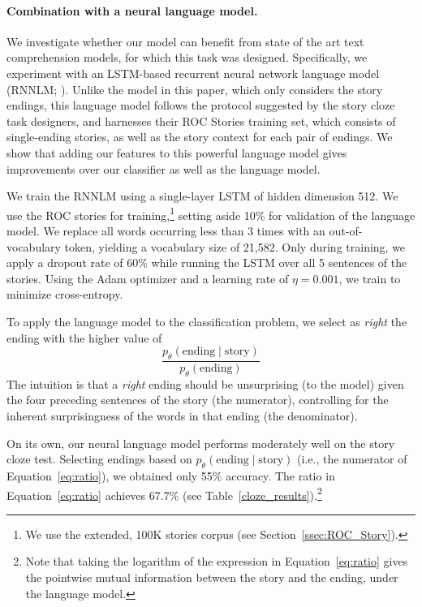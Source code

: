 \documentclass[11pt,a4paper]{article}
\newcommand{\secref}[1]{Section~\ref{ssec:#1}}
\newcommand{\tabref}[1]{Table~\ref{#1}}
\begin{document}
\paragraph{Combination with a neural language model.}
We investigate whether our model can benefit from state of the art text comprehension models, for which this task was designed. 
Specifically, we experiment with an LSTM-based \cite{hochreiter1997long} recurrent neural network language model (RNNLM; \citealp{mikolov2010recurrent}). 
Unlike the model in this paper, which only considers the story endings, this language model follows the protocol suggested by the story cloze task designers, and harnesses their ROC Stories training set, which consists of single-ending stories, 
as well as the story context for each pair of endings. 
We show that adding our features to this powerful language model
gives improvements over our classifier as well as the language
model. 


We train the RNNLM using a single-layer LSTM of hidden dimension 512.
We use the ROC stories for training,\footnote{We use the extended, 100K stories corpus (see \secref{ROC_Story}).} setting aside 10\% for validation of the language model. 
We replace all words occurring less than 3 times with an 
out-of-vocabulary token, yielding a vocabulary size of  21,582.
Only during training, we apply a dropout rate of 60\% while running the LSTM over all 5 sentences of the stories. 
Using the Adam optimizer \cite{kingma2014adam} and a learning rate of
$\eta=0.001$, we train to minimize cross-entropy. 

To apply the language model to the classification problem, we select
as \emph{right} the ending with the higher value of
\begin{equation}
\frac{p_\theta(\textrm{ending} \mid
  \textrm{story})}{p_\theta(\textrm{ending})} \label{eq:ratio}
\end{equation}
The intuition is that a \emph{right} ending should be unsurprising (to
the model)
given the four preceding sentences of the story (the numerator), controlling for the
inherent surprisingness of the words in that ending (the denominator).


On its own, our neural language model performs moderately well on the story cloze test. 
Selecting endings based on $p_\theta(\textrm{ending} \mid \textrm{story})$ (i.e., the numerator of
Equation~\ref{eq:ratio}), we obtained only 55\% accuracy.   The ratio
in Equation~\ref{eq:ratio} achieves 67.7\%  (see
\tabref{cloze_results}).\footnote{Note that taking the logarithm of
  the expression in Equation~\ref{eq:ratio} gives the pointwise mutual
information between the story and the ending, under the language
model.}
\end{document}
